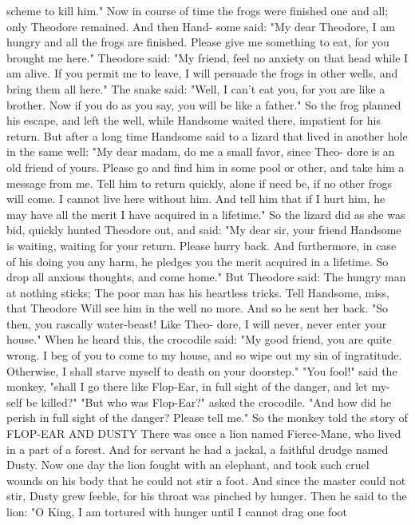 \documentclass{book}
\begin{document}
scheme to kill him."
Now in course of time the frogs were finished one
and all; only Theodore remained. And then Hand-
some said: "My dear Theodore, I am hungry and
all the frogs are finished. Please give me something
to eat, for you brought me here."
Theodore said: "My friend, feel no anxiety on
that head while I am alive. If you permit me to leave,
I will persuade the frogs in other wells, and bring
them all here."
The snake said: "Well, I can't eat you, for you
are like a brother. Now if you do as you say, you
will be like a father."
So the frog planned his escape, and left the well,
while Handsome waited there, impatient for his
return. But after a long time Handsome said to a
lizard that lived in another hole in the same well:
"My dear madam, do me a small favor, since Theo-
dore is an old friend of yours. Please go and find him
in some pool or other, and take him a message from
me. Tell him to return quickly, alone if need be, if
no other frogs will come. I cannot live here without
him. And tell him that if I hurt him, he may have
all the merit I have acquired in a lifetime."
So the lizard did as she was bid, quickly hunted
Theodore out, and said: "My dear sir, your friend
Handsome is waiting, waiting for your return. Please
hurry back. And furthermore, in case of his doing
you any harm, he pledges you the merit acquired in a
lifetime. So drop all anxious thoughts, and come
home." But Theodore said:
The hungry man at nothing sticks;
The poor man has his heartless tricks.
Tell Handsome, miss, that Theodore
Will see him in the well no more.
And so he sent her back.
"So then, you rascally water-beast! Like Theo-
dore, I will never, never enter your house."
When he heard this, the crocodile said: "My good
friend, you are quite wrong. I beg of you to come to
my house, and so wipe out my sin of ingratitude.
Otherwise, I shall starve myself to death on your
doorstep."
"You fool!" said the monkey, "shall I go there
like Flop-Ear, in full sight of the danger, and let my-
self be killed?"
"But who was Flop-Ear?" asked the crocodile.
"And how did he perish in full sight of the danger?
Please tell me." So the monkey told the story of
FLOP-EAR AND DUSTY
There was once a lion named Fierce-Mane, who
lived in a part of a forest. And for servant he had a
jackal, a faithful drudge named Dusty.
Now one day the lion fought with an elephant,
and took such cruel wounds on his body that he
could not stir a foot. And since the master could not
stir, Dusty grew feeble, for his throat was pinched by
hunger. Then he said to the lion: "O King, I am
tortured with hunger until I cannot drag one foot
\end{document}

